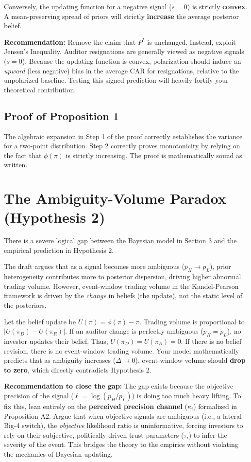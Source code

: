 \documentclass[12pt]{article}
\begin{document}
Conversely, the updating function for a negative signal ($s=0$) is strictly \textbf{convex}. A mean-preserving spread of priors will strictly \textbf{increase} the average posterior belief. 

\textbf{Recommendation:} Remove the claim that $P^*$ is unchanged. Instead, exploit Jensen's Inequality. Auditor resignations are generally viewed as negative signals ($s=0$). Because the updating function is convex, polarization should induce an \textit{upward} (less negative) bias in the average CAR for resignations, relative to the unpolarized baseline. Testing this signed prediction will heavily fortify your theoretical contribution.

\subsection{Proof of Proposition 1}
The algebraic expansion in Step 1 of the proof correctly establishes the variance for a two-point distribution. Step 2 correctly proves monotonicity by relying on the fact that $\phi(\pi)$ is strictly increasing. The proof is mathematically sound as written.

\section{The Ambiguity-Volume Paradox (Hypothesis 2)}

There is a severe logical gap between the Bayesian model in Section 3 and the empirical prediction in Hypothesis 2. 

The draft argues that as a signal becomes more ambiguous ($p_H \to p_L$), prior heterogeneity contributes more to posterior dispersion, driving higher abnormal trading volume. However, event-window trading volume in the Kandel-Pearson framework is driven by the \textit{change} in beliefs (the update), not the static level of the posteriors. 

Let the belief update be $U(\pi) = \phi(\pi) - \pi$. Trading volume is proportional to $|U(\pi_D) - U(\pi_R)|$.
If an auditor change is perfectly ambiguous ($p_H = p_L$), no investor updates their belief. Thus, $U(\pi_D) = U(\pi_R) = 0$. If there is no belief revision, there is no event-window trading volume. Your model mathematically predicts that as ambiguity increases ($\Delta \to 0$), event-window volume should \textbf{drop to zero}, which directly contradicts Hypothesis 2.

\textbf{Recommendation to close the gap:} The gap exists because the objective precision of the signal ($\ell = \log(p_H/p_L)$) is doing too much heavy lifting. To fix this, lean entirely on the \textbf{perceived precision channel} ($\kappa_i$) formalized in Proposition A2. Argue that when objective signals are ambiguous (i.e., a lateral Big-4 switch), the \textit{objective} likelihood ratio is uninformative, forcing investors to rely on their subjective, politically-driven trust parameters ($\tau_i$) to infer the severity of the event. This bridges the theory to the empirics without violating the mechanics of Bayesian updating.
\end{document}

